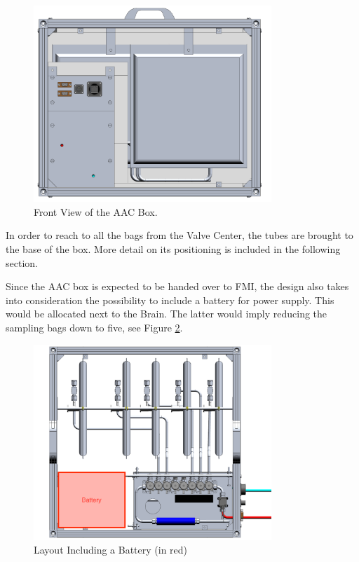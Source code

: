 \begin{figure}[H]
    \centering
    \includegraphics[width=0.8\textwidth]{4-experiment-design/img/Mechanical/AAC_front_view.png}
    \caption{Front View of the AAC Box.}
    \label{front_aac}
\end{figure}

In order to reach to all the bags from the Valve Center, the tubes are brought to the base of the box. More detail on its positioning is included in the following section. 

\smallskip
Since the AAC box is expected to be handed over to FMI, the design also takes into consideration the possibility to include a battery for power supply. This would be allocated next to the Brain. The latter would imply reducing the sampling bags down to five, see Figure \ref{battery_distribution}.


\begin{figure}[H]
    \centering
    \includegraphics[width=0.8\textwidth]{4-experiment-design/img/Mechanical/Battery_Top_View.png}
    \caption{Layout Including a Battery (in red)}
    \label{battery_distribution}
\end{figure}


